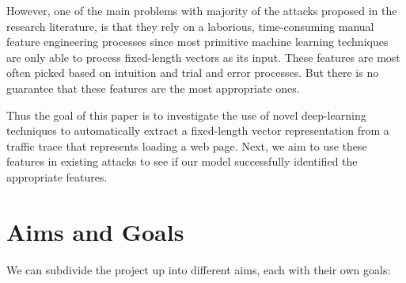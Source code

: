 However, one of the main problems with majority of the attacks proposed in the research literature, is that they rely on a laborious,
time-consuming manual feature engineering processes since most primitive machine learning techniques are only able to
process fixed-length vectors as its input. These features are most often picked based on intuition and trial and error processes.
But there is no guarantee that these features are the most appropriate ones.

Thus the goal of this paper is to investigate the use of novel deep-learning techniques to automatically extract
a fixed-length vector representation from a traffic trace that represents loading a web page.
Next, we aim to use these features in existing attacks to see if our model successfully identified the appropriate features.

\newpage

\section{Aims and Goals}
We can subdivide the project up into different aims, each with their own goals:

